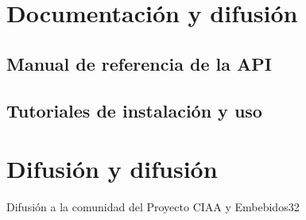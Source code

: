 \section{Documentación y difusión}
\label{sec:documentation}

\subsection{Manual de referencia de la API}



\subsection{Tutoriales de instalación y uso}



\section{Difusión y difusión}

Difusión a la comunidad del Proyecto CIAA y Embebidos32

